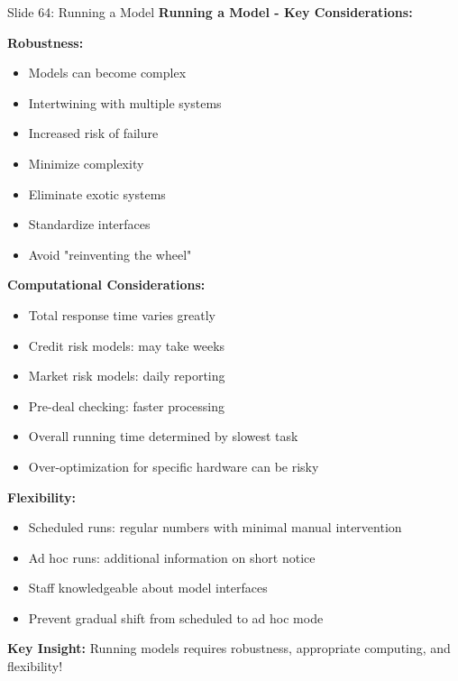 \documentclass[8pt]{beamer}
\begin{document}
	\begin{frame}{Slide 64: Running a Model}
		\fontsize{6.5}{7.5}\selectfont
		\textbf{Running a Model - Key Considerations:}
		
		\vspace{0.1cm}
		\textbf{Robustness:}
		\begin{itemize}
			\item Models can become complex
			\item Intertwining with multiple systems
			\item Increased risk of failure
			\item Minimize complexity
			\item Eliminate exotic systems
			\item Standardize interfaces
			\item Avoid "reinventing the wheel"
		\end{itemize}
		
		\vspace{0.1cm}
		\textbf{Computational Considerations:}
		\begin{itemize}
			\item Total response time varies greatly
			\item Credit risk models: may take weeks
			\item Market risk models: daily reporting
			\item Pre-deal checking: faster processing
			\item Overall running time determined by slowest task
			\item Over-optimization for specific hardware can be risky
		\end{itemize}
		
		\vspace{0.1cm}
		\textbf{Flexibility:}
		\begin{itemize}
			\item Scheduled runs: regular numbers with minimal manual intervention
			\item Ad hoc runs: additional information on short notice
			\item Staff knowledgeable about model interfaces
			\item Prevent gradual shift from scheduled to ad hoc mode
		\end{itemize}
		
		\textcolor{myblue}{\textbf{Key Insight:}} Running models requires \textcolor{myblue}{robustness, appropriate computing, and flexibility}!
	\end{frame}
	
\end{document}
